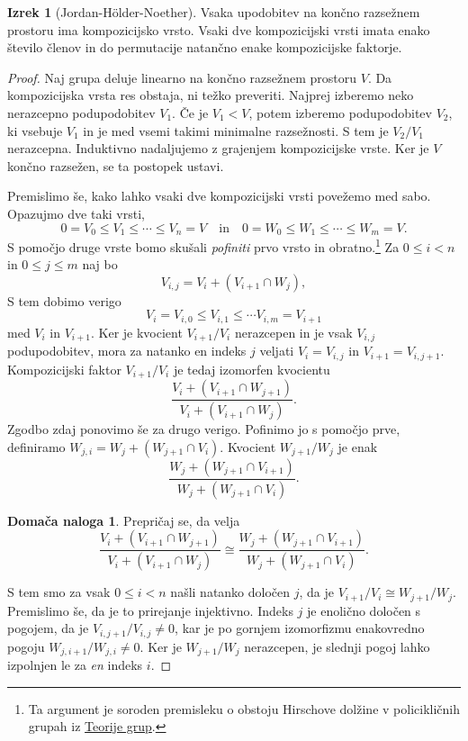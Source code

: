 \documentclass[11pt]{book}
\theoremstyle{definition}
\theoremstyle{zgled}
\theoremstyle{odprtproblem}
\theoremstyle{domacanaloga}
\newtheorem*{domacanaloga}{Domača naloga}
\newenvironment{dokaz}
    {\color{siva}\begin{proof}}
    {\end{proof}}
\theoremstyle{izrek}
\newtheorem*{izrek}{Izrek}
\begin{document}
\begin{izrek}[Jordan-Hölder-Noether]
Vsaka upodobitev na končno razsežnem prostoru ima kompozicijsko vrsto. Vsaki dve kompozicijski vrsti imata enako število členov in do permutacije natančno enake kompozicijske faktorje.
\end{izrek}
\begin{dokaz}
Naj grupa deluje linearno na končno razsežnem prostoru $V$. Da kompozicijska vrsta res obstaja, ni težko preveriti. Najprej izberemo neko nerazcepno podupodobitev $V_1$. Če je $V_1 < V$, potem izberemo podupodobitev $V_2$, ki vsebuje $V_1$ in je med vsemi takimi minimalne razsežnosti. S tem je $V_2/V_1$ nerazcepna. Induktivno nadaljujemo z grajenjem kompozicijske vrste. Ker je $V$ končno razsežen, se ta postopek ustavi.

Premislimo še, kako lahko vsaki dve kompozicijski vrsti povežemo med sabo. Opazujmo dve taki vrsti,
\[
    0 = V_0 \leq V_1 \leq \cdots \leq V_n = V 
    \quad \text{in} \quad
    0 = W_0 \leq W_1 \leq \cdots \leq W_m = V.
\]
S pomočjo druge vrste bomo skušali \emph{pofiniti} prvo vrsto in obratno.\footnote{Ta argument je soroden premisleku o obstoju Hirschove dolžine v policikličnih grupah iz \href{https://urbanjezernik.github.io/teorija-grup/}{Teorije grup}.} Za $0 \leq i < n$ in $0 \leq j \leq m$ naj bo
\[
    V_{i,j} = V_i + (V_{i+1} \cap W_j),
\]
S tem dobimo verigo
\[
    V_i = V_{i,0} \leq V_{i,1} \leq \cdots V_{i,m} = V_{i+1}
\]
med $V_i$ in $V_{i+1}$. Ker je kvocient $V_{i+1}/V_i$ nerazcepen in je vsak $V_{i,j}$ podupodobitev, mora za natanko en indeks $j$ veljati $V_i = V_{i,j}$ in $V_{i+1} = V_{i,j+1}$. Kompozicijski faktor $V_{i+1}/V_i$ je tedaj izomorfen kvocientu
\[
    \frac{V_i + (V_{i+1} \cap W_{j+1})}{V_i + (V_{i+1} \cap W_j)}.
\]
Zgodbo zdaj ponovimo še za drugo verigo. Pofinimo jo s pomočjo prve, definiramo $W_{j,i} = W_j + (W_{j+1} \cap V_i)$. Kvocient $W_{j+1}/W_j$ je enak
\[
    \frac{W_j + (W_{j+1} \cap V_{i+1})}{W_j + (W_{j+1} \cap V_i)}.
\]

\begin{domacanaloga}
Prepričaj se, da velja
\[
    \frac{V_i + (V_{i+1} \cap W_{j+1})}{V_i + (V_{i+1} \cap W_j)}
    \cong
    \frac{W_j + (W_{j+1} \cap V_{i+1})}{W_j + (W_{j+1} \cap V_i)}.
\]
\end{domacanaloga}

S tem smo za vsak $0 \leq i < n$ našli natanko določen $j$, da je $V_{i+1}/V_i \cong W_{j+1}/W_j$. Premislimo še, da je to prirejanje injektivno. Indeks $j$ je enolično določen s pogojem, da je $V_{i,j+1}/V_{i,j} \neq 0$, kar je po gornjem izomorfizmu enakovredno pogoju $W_{j,i+1}/W_{j,i} \neq 0$. Ker je $W_{j+1}/W_j$ nerazcepen, je slednji pogoj lahko izpolnjen le za \emph{en} indeks $i$.
\end{dokaz}
\end{document}
